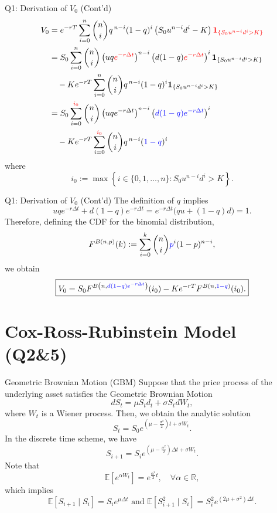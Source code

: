 \documentclass{beamer}
\newcommand{\bE}{\mathbb{E}}
\begin{document}
\begin{frame}{Q1: Derivation of $V_0$ (Cont'd)}
\footnotesize
\begin{align*}
V_0&= e^{-rT}
   \sum_{i=0}^{n}
   \binom{n}{i}
   q^{\,n-i}(1-q)^i
   \left(S_0u^{n-i}d^i-K\right)
   \textcolor{red}{\mathbf{1}_{\{S_0u^{n-i}d^i>K\}}}\\
&=
S_0
\sum_{i=0}^{n}
\binom{n}{i}
\left(uq\textcolor{red}{e^{-r\Delta t}}\right)^{n-i}
\left(d(1-q)\textcolor{red}{e^{-r\Delta t}}\right)^i
\mathbf{1}_{\{S_0u^{n-i}d^i>K\}}
\\
&\quad
-
Ke^{-rT}
\sum_{i=0}^{n}
\binom{n}{i}
q^{\,n-i}(1-q)^i
\mathbf{1}_{\{S_0u^{n-i}d^i>K\}}\\
&=
S_0
\sum_{i=0}^{\textcolor{red}{i_0}}
\binom{n}{i}
\left(uqe^{-r\Delta t}\right)^{n-i}
\left(\textcolor{blue}{d(1-q)e^{-r\Delta t}}\right)^i
\\
&\quad
-
Ke^{-rT}
\sum_{i=0}^{\textcolor{red}{i_0}}
\binom{n}{i}
q^{\,n-i}(\textcolor{blue}{1-q})^i
\end{align*}
where
\[i_0:=
\max\left\{
i\in\{0,1,\ldots,n\}:
S_0u^{n-i}d^i>K
\right\}.\]
\end{frame}

\begin{frame}{Q1: Derivation of $V_0$ (Cont'd)}
The definition of \(q\) implies
\[
uqe^{-r\Delta t}
+
d(1-q)e^{-r\Delta t}
=
e^{-r\Delta t}
\bigl(qu+(1-q)d\bigr)
=1.
\]
Therefore, defining the CDF for the binomial distribution,
\[
F^{B(n,p)}(k)
:=
\sum_{i=0}^{k}
\binom{n}{i}
\textcolor{blue}{p}^i(1-p)^{n-i},
\]
we obtain
\[
\boxed{
V_0
=
S_0
F^{B\left(n, \textcolor{blue}{d(1-q)e^{-r\Delta t}}\right)}(i_0)
-
Ke^{-rT}
F^{B(n,\textcolor{blue}{1-q})}(i_0).
}
\]
\end{frame}


\section[CRR]{Cox-Ross-Rubinstein Model (Q2\&5)}
\begin{frame}{Geometric Brownian Motion (GBM)}
Suppose that the price process of the underlying asset satisfies the Geometric Brownian Motion
\[
dS_t = \mu S_t d_t +\sigma S_t dW_t, 
\]
where $W_t$ is a Wiener process. Then, we obtain the analytic solution
\[
S_t = S_0 e^{(\mu-\frac{\sigma^2}{2})t + \sigma W_t}.
\]
In the discrete time scheme, we have
\[
S_{i+1} = S_i e^{(\mu-\frac{\sigma^2}{2})\Delta t + \sigma W_t}.
\]
Note that
\[
\bE[e^{\alpha W_t}] = e^{\frac{\alpha^2}{2}t}, \quad \forall \alpha \in \mathbb{R},
\]
which implies
\[
\boxed{
\bE[S_{i+1}\mid S_i]=S_i e^{\mu \Delta t} \text{ and } \bE[S^2_{i+1} \mid S_i] = S_i^2 e^{(2\mu +\sigma^2)\Delta t}.}
\]
\end{frame}
\end{document}
